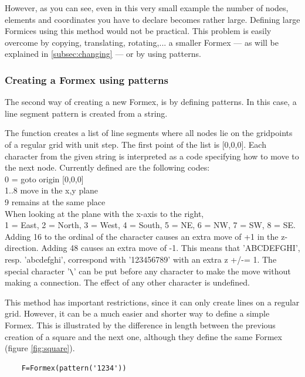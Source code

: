 {However, as you can see, even in this very small example the number of nodes, elements and coordinates you have to declare becomes rather large. Defining large Formices using this method would not be practical. This problem is easily overcome by copying, translating, rotating,... a smaller Formex --- as will be explained in \ref{subsec:changing} --- or by using patterns.
 
\subsubsection{Creating a Formex using patterns}

The second way of creating a new Formex, is by defining patterns. In this case, a line segment pattern is created from a string.

The function  creates a list of line segments where all nodes lie on the
gridpoints of a regular grid with unit step.
The first point of the list is [0,0,0]. Each character from the given
string  is interpreted as a code specifying how to move to the next node.
Currently defined are the following codes:\\
    0 = goto origin [0,0,0]\\
    1..8 move in the x,y plane\\
    9 remains at the same place\\
    When looking at the plane with the x-axis to the right,\\
    1 = East, 2 = North, 3 = West, 4 = South, 5 = NE, 6 = NW, 7 = SW, 8 = SE.\\
    Adding 16 to the ordinal of the character causes an extra move of +1 in
    the z-direction. Adding 48 causes an extra move of -1. This means that
    'ABCDEFGHI', resp. 'abcdefghi', correspond with '123456789' with an extra
    z +/-= 1.              
    The special character '\verb?\?' can be put before any character to make the
    move without making a connection.
    The effect of any other character is undefined.

This method has important restrictions, since it can only create lines on a regular grid. However, it can be a much easier and shorter way to define a simple Formex. This is illustrated by the difference in length between the previous creation of a square and the next one, although they define the same Formex (figure \ref{fig:square}).
\begin{verbatim}
	F=Formex(pattern('1234'))
\end{verbatim}

}

